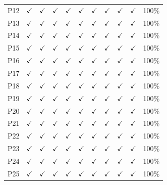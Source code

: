 \documentclass[11pt,letterpaper]{article}
\begin{document}
\begin{table}[htbp]
\begin{tabular}{lcccccccccc}
P12 & $\checkmark$ & $\checkmark$ & $\checkmark$ & $\checkmark$ & $\checkmark$ & $\checkmark$ & $\checkmark$ & $\checkmark$ & $\checkmark$ & 100\% \\
P13 & $\checkmark$ & $\checkmark$ & $\checkmark$ & $\checkmark$ & $\checkmark$ & $\checkmark$ & $\checkmark$ & $\checkmark$ & $\checkmark$ & 100\% \\
P14 & $\checkmark$ & $\checkmark$ & $\checkmark$ & $\checkmark$ & $\checkmark$ & $\checkmark$ & $\checkmark$ & $\checkmark$ & $\checkmark$ & 100\% \\
P15 & $\checkmark$ & $\checkmark$ & $\checkmark$ & $\checkmark$ & $\checkmark$ & $\checkmark$ & $\checkmark$ & $\checkmark$ & $\checkmark$ & 100\% \\
P16 & $\checkmark$ & $\checkmark$ & $\checkmark$ & $\checkmark$ & $\checkmark$ & $\checkmark$ & $\checkmark$ & $\checkmark$ & $\checkmark$ & 100\% \\
P17 & $\checkmark$ & $\checkmark$ & $\checkmark$ & $\checkmark$ & $\checkmark$ & $\checkmark$ & $\checkmark$ & $\checkmark$ & $\checkmark$ & 100\% \\
P18 & $\checkmark$ & $\checkmark$ & $\checkmark$ & $\checkmark$ & $\checkmark$ & $\checkmark$ & $\checkmark$ & $\checkmark$ & $\checkmark$ & 100\% \\
P19 & $\checkmark$ & $\checkmark$ & $\checkmark$ & $\checkmark$ & $\checkmark$ & $\checkmark$ & $\checkmark$ & $\checkmark$ & $\checkmark$ & 100\% \\
P20 & $\checkmark$ & $\checkmark$ & $\checkmark$ & $\checkmark$ & $\checkmark$ & $\checkmark$ & $\checkmark$ & $\checkmark$ & $\checkmark$ & 100\% \\
P21 & $\checkmark$ & $\checkmark$ & $\checkmark$ & $\checkmark$ & $\checkmark$ & $\checkmark$ & $\checkmark$ & $\checkmark$ & $\checkmark$ & 100\% \\
P22 & $\checkmark$ & $\checkmark$ & $\checkmark$ & $\checkmark$ & $\checkmark$ & $\checkmark$ & $\checkmark$ & $\checkmark$ & $\checkmark$ & 100\% \\
P23 & $\checkmark$ & $\checkmark$ & $\checkmark$ & $\checkmark$ & $\checkmark$ & $\checkmark$ & $\checkmark$ & $\checkmark$ & $\checkmark$ & 100\% \\
P24 & $\checkmark$ & $\checkmark$ & $\checkmark$ & $\checkmark$ & $\checkmark$ & $\checkmark$ & $\checkmark$ & $\checkmark$ & $\checkmark$ & 100\% \\
P25 & $\checkmark$ & $\checkmark$ & $\checkmark$ & $\checkmark$ & $\checkmark$ & $\checkmark$ & $\checkmark$ & $\checkmark$ & $\checkmark$ & 100\% \\
\bottomrule
\end{tabular}
\end{table}
\end{document}
